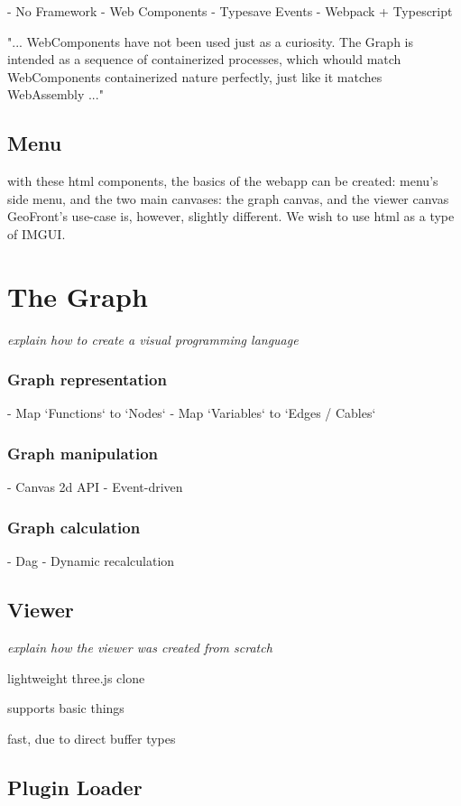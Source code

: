 - No Framework
- Web Components
- Typesave Events
- Webpack + Typescript

"...
WebComponents have not been used just as a curiosity. 
The Graph is intended as a sequence of containerized processes, 
which whould match WebComponents containerized nature perfectly, just like it matches WebAssembly
..."


\subsection{Menu}
with these html components, the basics of the webapp can be created: menu's side menu, and the two main canvases: the graph canvas, and the viewer canvas 
GeoFront's use-case is, however, slightly different. We wish to use html as a type of IMGUI. 


\section{The Graph}
\emph{explain how to create a visual programming language}
\subsubsection*{Graph representation}
  - Map `Functions` to `Nodes` 
  - Map `Variables` to `Edges / Cables`
\subsubsection*{Graph manipulation}
  - Canvas 2d API
  - Event-driven
\subsubsection*{Graph calculation}
  - Dag
  - Dynamic recalculation 

\subsection{Viewer}
\emph{explain how the viewer was created from scratch}

lightweight three.js clone

supports basic things

fast, due to direct buffer types

\subsection{ Plugin Loader } 


